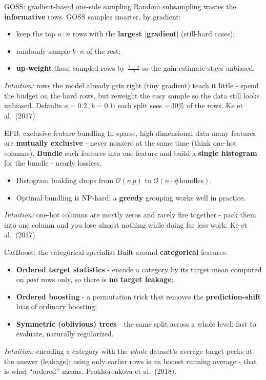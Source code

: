 \documentclass[aspectratio=169]{beamer}
\begin{document}
\begin{frame}{GOSS: gradient-based one-side sampling}
  Random subsampling wastes the \textbf{informative} rows. GOSS samples smarter, by gradient:
  \begin{itemize}\small
    \item keep the top $a\!\cdot\!n$ rows with the \textbf{largest $|$gradient$|$} (still-hard cases);
    \item randomly sample $b\!\cdot\!n$ of the rest;
    \item \textbf{up-weight} those sampled rows by $\tfrac{1-a}{b}$ so the gain estimate stays unbiased.
  \end{itemize}
  \vfill
  {\footnotesize \emph{Intuition:} rows the model already gets right (tiny gradient) teach it
  little - spend the budget on the hard rows, but reweight the easy sample so the data still looks
  unbiased. Defaults $a=0.2,\ b=0.1$: each split sees ${\sim}\,30\%$ of the rows.}
  \hfill {\scriptsize Ke et al.\ (2017).}
\end{frame}

\begin{frame}{EFB: exclusive feature bundling}
  In sparse, high-dimensional data many features are \textbf{mutually exclusive} - never nonzero
  at the same time (think one-hot columns).
  \vfill
  \textbf{Bundle} such features into one feature and build a \textbf{single histogram} for the
  bundle - nearly lossless.
  \begin{itemize}\small
    \item Histogram building drops from $\mathcal{O}(n\,p)$ to $\mathcal{O}(n \cdot \#\text{bundles})$.
    \item Optimal bundling is NP-hard; a \textbf{greedy} grouping works well in practice.
  \end{itemize}
  {\footnotesize \emph{Intuition:} one-hot columns are mostly zeros and rarely fire together - pack
  them into one column and you lose almost nothing while doing far less work.}
  \hfill {\scriptsize Ke et al.\ (2017).}
\end{frame}

\begin{frame}{CatBoost: the categorical specialist}
  Built around \textbf{categorical} features:
  \begin{itemize}\small
    \item \textbf{Ordered target statistics} - encode a category by its target mean computed on
      \emph{past} rows only, so there is \textbf{no target leakage};
    \item \textbf{Ordered boosting} - a permutation trick that removes the
      \textbf{prediction-shift} bias of ordinary boosting;
    \item \textbf{Symmetric (oblivious) trees} - the same split across a whole level: fast to
      evaluate, naturally regularized.
  \end{itemize}
  {\footnotesize \emph{Intuition:} encoding a category with the \emph{whole} dataset's average
  target peeks at the answer (leakage); using only earlier rows is an honest running average -
  that is what ``ordered'' means.}
  \hfill {\scriptsize Prokhorenkova et al.\ (2018).}
\end{frame}
\end{document}
